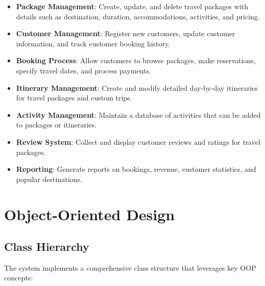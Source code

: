 \documentclass[12pt]{article}
\begin{document}
\begin{itemize}
    \item \textbf{Package Management}: Create, update, and delete travel packages with details such as destination, duration, accommodations, activities, and pricing.
    
    \item \textbf{Customer Management}: Register new customers, update customer information, and track customer booking history.
    
    \item \textbf{Booking Process}: Allow customers to browse packages, make reservations, specify travel dates, and process payments.
    
    \item \textbf{Itinerary Management}: Create and modify detailed day-by-day itineraries for travel packages and custom trips.
    
    \item \textbf{Activity Management}: Maintain a database of activities that can be added to packages or itineraries.
    
    \item \textbf{Review System}: Collect and display customer reviews and ratings for travel packages.
    
    \item \textbf{Reporting}: Generate reports on bookings, revenue, customer statistics, and popular destinations.
\end{itemize}

\section{Object-Oriented Design}

\subsection{Class Hierarchy}
The system implements a comprehensive class structure that leverages key OOP concepts:
\end{document}
